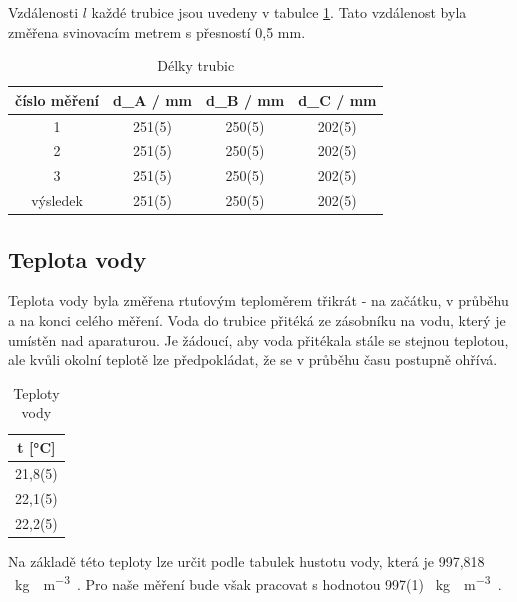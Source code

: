     Vzdálenosti \(l\) každé trubice jsou uvedeny v tabulce \ref{tab:délky}. Tato vzdálenost byla změřena svinovacím metrem s přesností 0,5 mm.

    \begin{table}[h]
        \centering
        \caption{Délky trubic}
        \label{tab:délky}
        \begin{tabular}{|c|c|c|c|} 
        \hline
            číslo měření & d_A / mm & d_B / mm & d_C / mm  \\ 
        \hline
            1            & 251(5)    & 250(5)    & 202(5)   \\
            2            & 251(5)    & 250(5)    & 202(5)   \\
            3            & 251(5)    & 250(5)    & 202(5)   \\ 
        \hline
            výsledek     & 251(5)    & 250(5)    & 202(5)   \\
        \hline
        \end{tabular}
    \end{table}
\newpage

\subsection{Teplota vody}

    Teplota vody byla změřena rtuťovým teploměrem třikrát - na začátku, v průběhu a na konci celého měření. Voda do trubice přitéká ze zásobníku na vodu, který je umístěn nad aparaturou. Je žádoucí, aby voda přitékala stále se stejnou teplotou, ale kvůli okolní teplotě lze předpokládat, že se v průběhu času postupně ohřívá.

    \begin{table}[h]
        \centering
        \caption{Teploty vody}
        \label{tab:teploty_vody}
        \begin{tabular}{|c|} 
        \hline
            t [°C]   \\ 
        \hline
            21,8(5)  \\
            22,1(5)  \\
            22,2(5)  \\
        \hline
        \end{tabular}
    \end{table}

    Na základě této teploty lze určit podle tabulek hustotu vody, která je 997,818 \SI{}{\kg\water\per\m\cubed\air}. Pro naše měření bude však pracovat s hodnotou 997(1) \SI{}{\kg\water\per\m\cubed\air}.

